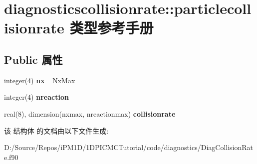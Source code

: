 \hypertarget{structdiagnosticscollisionrate_1_1particlecollisionrate}{}\section{diagnosticscollisionrate\+::particlecollisionrate 类型参考手册}
\label{structdiagnosticscollisionrate_1_1particlecollisionrate}
\subsection*{Public 属性}
\begin{DoxyCompactItemize}
\item 
\mbox{\label{structdiagnosticscollisionrate_1_1particlecollisionrate_a48bc5826ce43e1c56dc3642a64bceb0a}} 
integer(4) {\bfseries nx} =Nx\+Max
\item 
\mbox{\label{structdiagnosticscollisionrate_1_1particlecollisionrate_a845ef1aad94f82fd3a0c97611fc94ada}} 
integer(4) {\bfseries nreaction}
\item 
\mbox{\label{structdiagnosticscollisionrate_1_1particlecollisionrate_a4c8f5fb5102524bbd42b74ba596cc728}} 
real(8), dimension(nxmax, nreactionmax) {\bfseries collisionrate}
\end{DoxyCompactItemize}


该 结构体 的文档由以下文件生成\+:\begin{DoxyCompactItemize}
\item 
D\+:/\+Source/\+Repos/i\+P\+M1\+D/1\+D\+P\+I\+C\+M\+C\+Tutorial/code/diagnostics/Diag\+Collision\+Rate.\+f90\end{DoxyCompactItemize}
